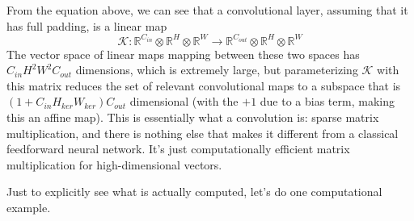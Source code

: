 \documentclass{article}
\begin{document}
\begin{definition}
\begin{enumerate}
    \end{enumerate}
    From the equation above, we can see that a convolutional layer, assuming that it has full padding, is a linear map  
    \begin{equation}
      \mathcal{K} : \mathbb{R}^{C_{in}} \otimes \mathbb{R}^H \otimes \mathbb{R}^W \rightarrow \mathbb{R}^{C_{out}} \otimes \mathbb{R}^H \otimes \mathbb{R}^W
      \label{eq:conv_mapping}
    \end{equation}
    The vector space of linear maps mapping between these two spaces has $C_{in} H^2 W^2 C_{out}$ dimensions, which is extremely large, but parameterizing $\mathcal{K}$ with this matrix reduces the set of relevant convolutional maps to a subspace that is $(1 + C_{in} H_{ker} W_{ker}) C_{out}$ dimensional (with the $+1$ due to a bias term, making this an affine map). This is essentially what a convolution is: sparse matrix multiplication, and there is nothing else that makes it different from a classical feedforward neural network. It's just computationally efficient matrix multiplication for high-dimensional vectors. 
    \end{definition}

    Just to explicitly see what is actually computed, let's do one computational example. 
\end{document}
